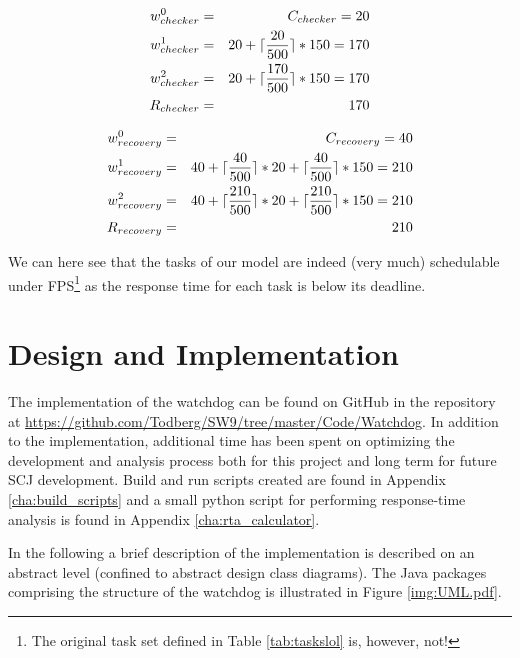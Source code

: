 \begin{eqnarray}
    w_{checker}^0 &=& C_{checker} = 20 \nonumber \\ 
    w_{checker}^1 &=& 20 + \lceil\frac{20}{500}\rceil*150 = 170 \nonumber \\ 
    w_{checker}^2 &=& 20 + \lceil\frac{170}{500}\rceil*150 = 170 \nonumber \\
    R_{checker} &=& 170
\end{eqnarray}

\begin{eqnarray}
    w_{recovery}^0 &=& C_{recovery} = 40 \nonumber \\ 
    w_{recovery}^1 &=& 40 + \lceil\frac{40}{500}\rceil*20 + \lceil\frac{40}{500}\rceil*150 = 210 \nonumber \\ 
    w_{recovery}^2 &=& 40 + \lceil\frac{210}{500}\rceil*20 + \lceil\frac{210}{500}\rceil*150 = 210 \nonumber \\
    R_{recovery} &=& 210
\end{eqnarray}

We can here see that the tasks of our model are indeed (very much) schedulable under FPS\footnote{The original task set defined in Table \ref{tab:taskslol} is, however, not!} as the response time for each task is below its deadline.

\chapter{Design and Implementation}
The implementation of the watchdog can be found on GitHub in the repository at \url{https://github.com/Todberg/SW9/tree/master/Code/Watchdog}. In addition to the implementation, additional time has been spent on optimizing the development and analysis process both for this project and long term for future SCJ development. Build and run scripts created are found in Appendix \ref{cha:build_scripts} and a small python script for performing response-time analysis is found in Appendix \ref{cha:rta_calculator}.

In the following a brief description of the implementation is described on an abstract level (confined to abstract design class diagrams). The Java packages comprising the structure of the watchdog is illustrated in Figure \ref{img:UML.pdf}. 

